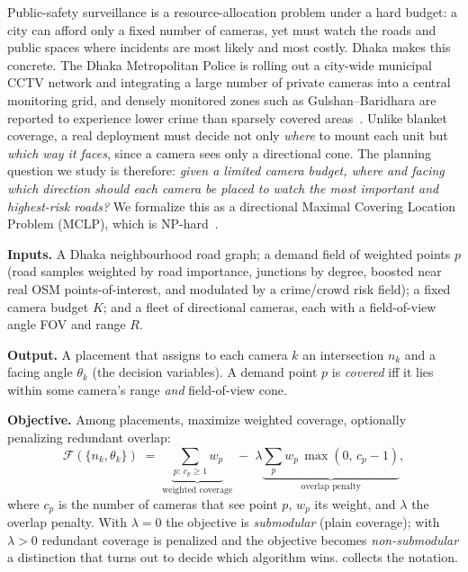 \documentclass{ai-lab-report}
\begin{document}
Public-safety surveillance is a resource-allocation problem under a hard budget: a city can afford only a fixed number of cameras, yet must watch the roads and public spaces where incidents are most likely and most costly. Dhaka makes this concrete. The Dhaka Metropolitan Police is rolling out a city-wide municipal CCTV network and integrating a large number of private cameras into a central monitoring grid, and densely monitored zones such as Gulshan--Baridhara are reported to experience lower crime than sparsely covered areas~\citep{tbs2023cctv,dailystar2023cctv}. Unlike blanket coverage, a real deployment must decide not only \emph{where} to mount each unit but \emph{which way it faces}, since a camera sees only a directional cone. The planning question we study is therefore: \emph{given a limited camera budget, where and facing which direction should each camera be placed to watch the most important and highest-risk roads?} We formalize this as a directional Maximal Covering Location Problem (MCLP), which is NP-hard~\citep{church1974maximal}.

\textbf{Inputs.} A Dhaka neighbourhood road graph; a demand field of weighted points $p$ (road samples weighted by road importance, junctions by degree, boosted near real OSM points-of-interest, and modulated by a crime/crowd risk field); a fixed camera budget $K$; and a fleet of directional cameras, each with a field-of-view angle FOV and range $R$.

\textbf{Output.} A placement that assigns to each camera $k$ an intersection $n_k$ and a facing angle $\theta_k$ (the decision variables). A demand point $p$ is \emph{covered} iff it lies within some camera's range \emph{and} field-of-view cone.

\textbf{Objective.} Among placements, maximize weighted coverage, optionally penalizing redundant overlap:
\begin{equation}
\mathcal{F}(\{n_k,\theta_k\}) \;=\; \underbrace{\textstyle\sum_{p:\,c_p\ge1} w_p}_{\text{weighted coverage}} \;-\; \lambda\underbrace{\textstyle\sum_{p} w_p\,\max(0,\, c_p-1)}_{\text{overlap penalty}},
\label{eq:cctvobj}
\end{equation}
where $c_p$ is the number of cameras that see point $p$, $w_p$ its weight, and $\lambda$ the overlap penalty. With $\lambda=0$ the objective is \emph{submodular} (plain coverage); with $\lambda>0$ redundant coverage is penalized and the objective becomes \emph{non-submodular} a distinction that turns out to decide which algorithm wins.  collects the notation.
\end{document}
